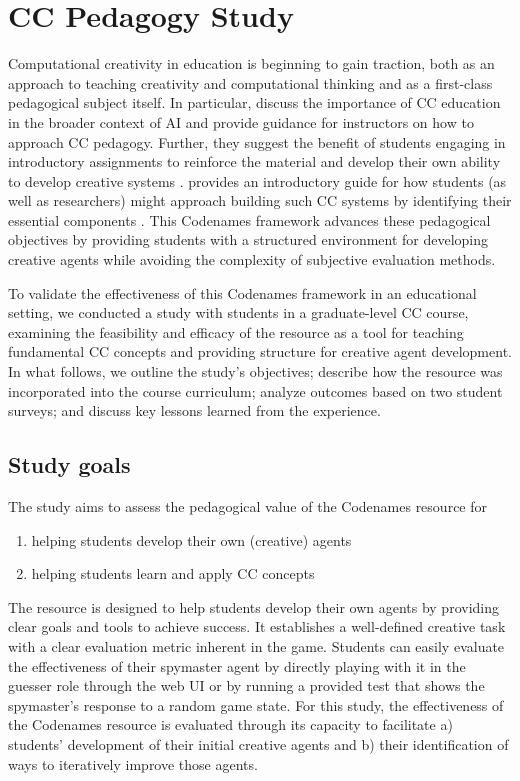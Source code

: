 \documentclass[phd,electronic,oneside,twosidetoc,letterpaper,chaptercenter,parttop,lof]{byumsphd}
\begin{document}
\section{CC Pedagogy Study}

Computational creativity in education is beginning to gain traction, both as an approach to teaching creativity and computational thinking \cite{kakavas2019,fragapane2021,yee-king2024} and as a first-class pedagogical subject itself.  In particular, \citeauthor{ackerman2017teaching} discuss the importance of CC education in the broader context of AI and provide guidance for instructors on how to approach CC pedagogy. Further, they suggest the benefit of students engaging in introductory assignments to reinforce the material and develop their own ability to develop creative systems \cite{ackerman2017teaching}. \citeauthor{ventura2017howto} provides an introductory guide for how students (as well as researchers) might approach building such CC systems by identifying their essential components \cite{ventura2017howto}. This Codenames framework advances these pedagogical objectives by providing students with a structured environment for developing creative agents while avoiding the complexity of subjective evaluation methods.

To validate the effectiveness of this Codenames framework in an educational setting, we conducted a study with students in a graduate-level CC course, examining the feasibility and efficacy of the resource as a tool for teaching fundamental CC concepts and providing structure for creative agent development.  In what follows, we outline the study's objectives;  describe how the resource was incorporated into the course curriculum; analyze outcomes based on two student surveys; and discuss key lessons learned from the experience.

\subsection{Study goals}

The study aims to assess the pedagogical value of the Codenames resource for

\begin{enumerate}
\item helping students develop their own (creative) agents
\item helping students learn and apply CC concepts
\end{enumerate}

The resource is designed to help students develop their own agents by providing clear goals and tools to achieve success.  It establishes a well-defined creative task with a clear evaluation metric inherent in the game. Students can easily evaluate the effectiveness of their spymaster agent by directly playing with it in the guesser role through the web UI or by running a provided test that shows the spymaster's response to a random game state. For this study, the effectiveness of the Codenames resource is evaluated through its capacity to facilitate a) students' development of their initial creative agents and b) their identification of ways to iteratively improve those agents.
\end{document}
